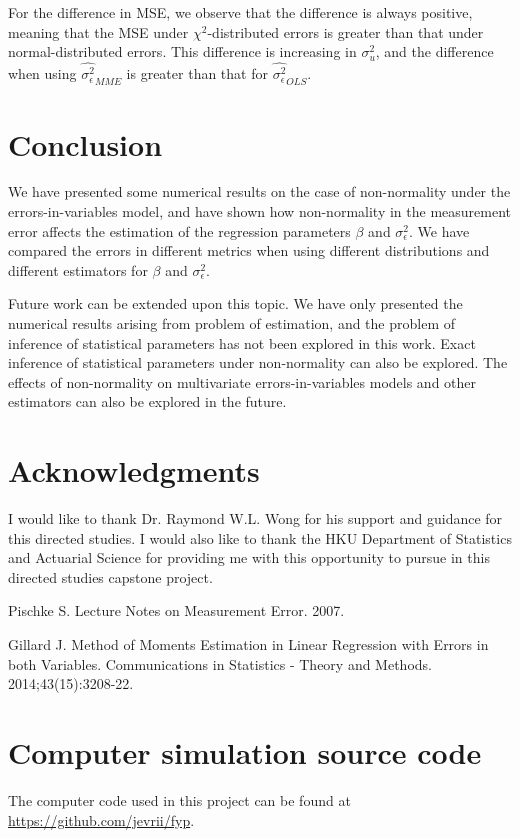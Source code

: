 \documentclass{article}
\begin{document}
For the difference in MSE, we observe that the difference is always positive, meaning that the MSE under $\chi^2$-distributed errors is greater than that under normal-distributed errors.
This difference is increasing in $\sigma^2_u$, and the difference when using $\hat{\sigma^2_\epsilon}_{MME}$ is greater than that for $\hat{\sigma^2_\epsilon}_{OLS}$.

\section{Conclusion}

We have presented some numerical results on the case of non-normality under the errors-in-variables model,
and have shown how non-normality in the measurement error affects the estimation of the regression parameters $\beta$ and $\sigma^2_\epsilon$. 
We have compared the errors in different metrics when using different distributions and different estimators for $\beta$ and $\sigma^2_\epsilon$.

Future work can be extended upon this topic.
We have only presented the numerical results arising from problem of estimation,
and the problem of inference of statistical parameters has not been explored in this work.
Exact inference of statistical parameters under non-normality can also be explored.
The effects of non-normality on multivariate errors-in-variables models and other estimators can also be explored in the future.

\section{Acknowledgments}

I would like to thank Dr. Raymond W.L. Wong for his support and guidance for this directed studies.
I would also like to thank the HKU Department of Statistics and Actuarial Science for providing me with this opportunity to pursue in this directed studies capstone project.

\begin{thebibliography}{9}

    Pischke S. Lecture Notes on Measurement Error. 2007.

    Gillard J. Method of Moments Estimation in Linear Regression with Errors in both Variables. Communications in Statistics - Theory and Methods. 2014;43(15):3208-22.
\end{thebibliography}

\appendix

\section{Computer simulation source code}

The computer code used in this project can be found at \url{https://github.com/jevrii/fyp}.


\end{document}

